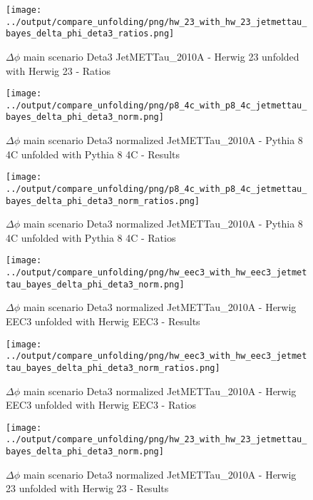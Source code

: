 \documentclass[11pt]{book}
\begin{document}
\begin{figure}[ht]
\centering
\texttt{[image: ../output/compare\_unfolding/png/hw\_23\_with\_hw\_23\_jetmettau\_bayes\_delta\_phi\_deta3\_ratios.png]}
\caption{$\Delta\phi$ main scenario Deta3 JetMETTau\_2010A - Herwig 23 unfolded with Herwig 23 - Ratios}
\label{hw_23_hw_23_jetmettau_bayes_delta_phi_deta3_b}
\end{figure}


\begin{figure}[ht]
\centering
\texttt{[image: ../output/compare\_unfolding/png/p8\_4c\_with\_p8\_4c\_jetmettau\_bayes\_delta\_phi\_deta3\_norm.png]}
\caption{$\Delta\phi$ main scenario Deta3 normalized JetMETTau\_2010A - Pythia 8 4C unfolded with Pythia 8 4C - Results}
\label{p8_p8_jetmettau_bayes_delta_phi_deta3_norm_a}
\end{figure}

\begin{figure}[ht]
\centering
\texttt{[image: ../output/compare\_unfolding/png/p8\_4c\_with\_p8\_4c\_jetmettau\_bayes\_delta\_phi\_deta3\_norm\_ratios.png]}
\caption{$\Delta\phi$ main scenario Deta3 normalized JetMETTau\_2010A - Pythia 8 4C unfolded with Pythia 8 4C - Ratios}
\label{p8_p8_jetmettau_bayes_delta_phi_deta3_norm_b}
\end{figure}

\begin{figure}[ht]
\centering
\texttt{[image: ../output/compare\_unfolding/png/hw\_eec3\_with\_hw\_eec3\_jetmettau\_bayes\_delta\_phi\_deta3\_norm.png]}
\caption{$\Delta\phi$ main scenario Deta3 normalized JetMETTau\_2010A - Herwig EEC3 unfolded with Herwig EEC3 - Results}
\label{hw_eec3_hw_eec3_jetmettau_bayes_delta_phi_deta3_norm_a}
\end{figure}

\begin{figure}[ht]
\centering
\texttt{[image: ../output/compare\_unfolding/png/hw\_eec3\_with\_hw\_eec3\_jetmettau\_bayes\_delta\_phi\_deta3\_norm\_ratios.png]}
\caption{$\Delta\phi$ main scenario Deta3 normalized JetMETTau\_2010A - Herwig EEC3 unfolded with Herwig EEC3 - Ratios}
\label{hw_eec3_hw_eec3_jetmettau_bayes_delta_phi_deta3_norm_b}
\end{figure}

\begin{figure}[ht]
\centering
\texttt{[image: ../output/compare\_unfolding/png/hw\_23\_with\_hw\_23\_jetmettau\_bayes\_delta\_phi\_deta3\_norm.png]}
\caption{$\Delta\phi$ main scenario Deta3 normalized JetMETTau\_2010A - Herwig 23 unfolded with Herwig 23 - Results}
\label{hw_23_hw_23_jetmettau_bayes_delta_phi_deta3_norm_a}
\end{figure}
\end{document}
